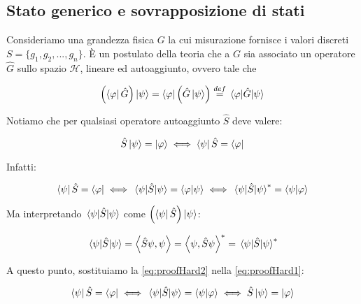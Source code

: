 \subsection{Stato generico e sovrapposizione di stati}

Consideriamo una grandezza fisica $G$ la cui misurazione fornisce i valori discreti $S = \{g_1, g_2, ..., g_n\}$. È un postulato della teoria che a $G$ sia associato un operatore $\hat{G}$ sullo spazio $\mathcal{H}$, lineare ed autoaggiunto, ovvero tale che

    \begin{equation}
        \left ( \bra{\varphi} \hat{G} \right ) \ket{\psi} =
        \bra{\varphi} \left ( \hat{G} \ket{\psi} \right ) \overset{def}{=}
        \mel{\varphi}{\hat{G}}{\psi}
    \end{equation}

Notiamo che per qualsiasi operatore autoaggiunto $\hat{S}$ deve valere:
    
    \begin{equation} \label{eq:proofHard0}
        \hat{S} \ket{\psi} = \ket{\varphi} \iff \bra{\psi} \hat{S} = \bra{\varphi}
    \end{equation}
    
Infatti:

    \begin{equation} \label{eq:proofHard1}
        \bra{\psi} \hat{S} = \bra{\varphi} \iff 
        \mel{\psi}{\hat{S}}{\psi} = \braket{\varphi}{\psi} \iff
        \mel{\psi}{\hat{S}}{\psi}^* = \braket{\psi}{\varphi}
    \end{equation}  
    
Ma interpretando $\mel{\psi}{\hat{S}}{\psi}$ come $\left ( \bra{\psi} \hat{S} \right ) \ket{    \psi}$:

    \begin{equation} \label{eq:proofHard2}
        \mel{\psi}{\hat{S}}{\psi} = \left \langle \hat{S} \psi, \psi \right \rangle =
        \left \langle \psi, \hat{S} \psi \right \rangle^* = \mel{\psi}{\hat{S}}{\psi}^*
    \end{equation}
    
A questo punto, sostituiamo la \eqref{eq:proofHard2} nella \eqref{eq:proofHard1}:

    \begin{equation}
        \bra{\psi} \hat{S} = \bra{\varphi} \iff \mel{\psi}{\hat{S}}{\psi} = \braket{\psi}{\varphi} \iff \hat{S} \ket{\psi}  = \ket{\varphi}
    \end{equation}

